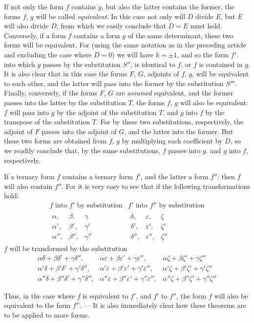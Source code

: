 If not only the form $f$ contains $g$, but also the latter contains the former, the forms $f$, $g$ will be called \textit{equivalent}. In this case not only will $D$ divide $E$, but $E$ will also divide $D$, from which we easily conclude that $D=E$ must hold. Conversely, if a form $f$ contains a form $g$ of the same determinant, these two forms will be equivalent. For (using the same notation as in the preceding article and excluding the case where $D=0$) we will have $k=\pm1$, and so the form $f'$. into which $g$ passes by the substitution $S''$, is identical to $f$, or $f$ is contained in $g$. It is also clear that in this case the forms $F$, $G$, adjoints of $f$, $g$, will be equivalent to each other, and the latter will pass into the former by the substitution $S'''$. Finally, conversely, if the forms $F$, $G$ are \textit{assumed} equivalent, and the former passes into the latter by the substitution $T$, the forms $f$, $g$ will also be equivalent: $f$ will pass into $g$ by the adjoint of the substitution $T$, and $g$ into $f$ by the transpose of the substitution $T$. For by these two substitutions, respectively, the adjoint of $F$ passes into the adjoint of $G$, and the latter into the former. But these two forms are obtained from $f$, $g$ by multiplying each coefficient by $D$, so we readily conclude that, by the same substitutions, $f$ passes into $g$. and $g$ into $f$, respectively.

If a ternary form $f$ contains a ternary form $f'$, and the latter a form $f''$: then $f$ will also contain $f''$. For it is very easy to see that if the following transformations hold:
\[
\begin{array}{c|c}
f\text{ into }f'\text{ by substitution} & f'\text{ into }f''\text{ by substitution} \\[2pt]
\begin{array}{ccc}
\alpha, & \beta, & \gamma \\
\alpha', & \beta', & \gamma' \\
\alpha'', & \beta'', & \gamma''
\end{array}
&
\begin{array}{ccc}
\delta, & \varepsilon, & \zeta \\
\delta', & \varepsilon', & \zeta' \\
\delta'', & \varepsilon'', & \zeta''
\end{array}
\end{array}
\]
$f$ will be transformed by the substitution
\[
\begin{array}{ccc}
\alpha\delta+\beta\delta'+\gamma\delta'', & \alpha\varepsilon+\beta\varepsilon'+\gamma\varepsilon'', & \alpha\zeta+\beta\zeta'+\gamma\zeta'' \\
\alpha'\delta+\beta'\delta'+\gamma'\delta'', & \alpha'\varepsilon+\beta'\varepsilon'+\gamma'\varepsilon'', & \alpha'\zeta+\beta'\zeta'+\gamma'\zeta'' \\
\alpha''\delta+\beta''\delta'+\gamma''\delta'', & \alpha''\varepsilon+\beta''\varepsilon'+\gamma''\varepsilon'', & \alpha''\zeta+\beta''\zeta'+\gamma''\zeta''
\end{array}
\]

Thus, in the case where $f$ is equivalent to $f'$, and $f'$ to $f''$, the form $f$ will also be equivalent to the form $f''$. --- It is also immediately clear how these theorems are to be applied to more forms.
